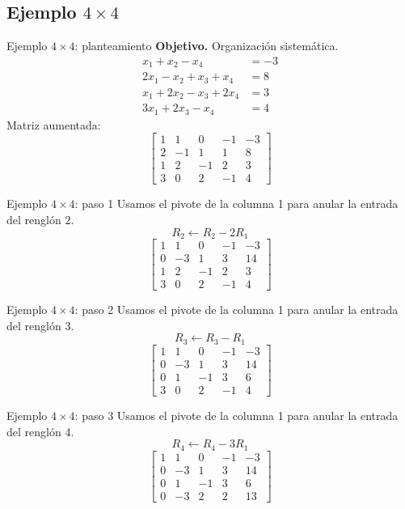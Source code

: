 \documentclass[aspectratio=169,9pt]{beamer}
\theoremstyle{remark}
\begin{document}
\subsection{Ejemplo $4\times4$}
\begin{frame}[t]{Ejemplo $4\times4$: planteamiento}
\textbf{Objetivo.} Organización sistemática.
\[
\begin{aligned}
x_{1} + x_{2} - x_{4} &= -3\\
2 x_{1} - x_{2} + x_{3} + x_{4} &= 8\\
x_{1} + 2 x_{2} - x_{3} + 2 x_{4} &= 3\\
3 x_{1} + 2 x_{3} - x_{4} &= 4
\end{aligned}
\]
Matriz aumentada:
\[
\left[\begin{array}{cccc|c}
1 & 1 & 0 & -1 & -3\\
2 & -1 & 1 & 1 & 8\\
1 & 2 & -1 & 2 & 3\\
3 & 0 & 2 & -1 & 4
\end{array}\right]
\]
\end{frame}
\begin{frame}[t]{Ejemplo $4\times4$: paso 1}
Usamos el pivote de la columna 1 para anular la entrada del renglón 2.
\[
R_{2}\leftarrow R_{2}-2R_{1}
\]
\[
\left[\begin{array}{cccc|c}
1 & 1 & 0 & -1 & -3\\
0 & -3 & 1 & 3 & 14\\
1 & 2 & -1 & 2 & 3\\
3 & 0 & 2 & -1 & 4
\end{array}\right]
\]
\end{frame}
\begin{frame}[t]{Ejemplo $4\times4$: paso 2}
Usamos el pivote de la columna 1 para anular la entrada del renglón 3.
\[
R_{3}\leftarrow R_{3}-R_{1}
\]
\[
\left[\begin{array}{cccc|c}
1 & 1 & 0 & -1 & -3\\
0 & -3 & 1 & 3 & 14\\
0 & 1 & -1 & 3 & 6\\
3 & 0 & 2 & -1 & 4
\end{array}\right]
\]
\end{frame}
\begin{frame}[t]{Ejemplo $4\times4$: paso 3}
Usamos el pivote de la columna 1 para anular la entrada del renglón 4.
\[
R_{4}\leftarrow R_{4}-3R_{1}
\]
\[
\left[\begin{array}{cccc|c}
1 & 1 & 0 & -1 & -3\\
0 & -3 & 1 & 3 & 14\\
0 & 1 & -1 & 3 & 6\\
0 & -3 & 2 & 2 & 13
\end{array}\right]
\]
\end{frame}
\end{document}
